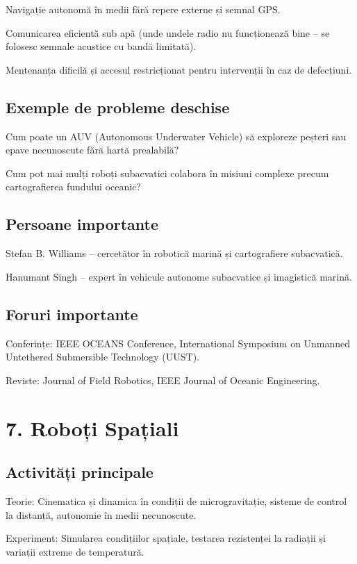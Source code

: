 \documentclass[12pt]{article}
\begin{document}
Navigație autonomă în medii fără repere externe și semnal GPS.

Comunicarea eficientă sub apă (unde undele radio nu funcționează bine – se folosesc semnale acustice cu bandă limitată).

Mentenanța dificilă și accesul restricționat pentru intervenții în caz de defecțiuni.

\subsection*{Exemple de probleme deschise}

Cum poate un AUV (Autonomous Underwater Vehicle) să exploreze peșteri sau epave necunoscute fără hartă prealabilă?

Cum pot mai mulți roboți subacvatici colabora în misiuni complexe precum cartografierea fundului oceanic?

\subsection*{Persoane importante}

Stefan B. Williams – cercetător în robotică marină și cartografiere subacvatică.

Hanumant Singh – expert în vehicule autonome subacvatice și imagistică marină.

\subsection*{Foruri importante}

Conferințe: IEEE OCEANS Conference, International Symposium on Unmanned Untethered Submersible Technology (UUST).

Reviste: Journal of Field Robotics, IEEE Journal of Oceanic Engineering.

\section{7. Roboți Spațiali}

\subsection*{Activități principale}

Teorie:
Cinematica și dinamica în condiții de microgravitație, sisteme de control la distanță, autonomie în medii necunoscute.

Experiment:
Simularea condițiilor spațiale, testarea rezistenței la radiații și variații extreme de temperatură.
\end{document}
